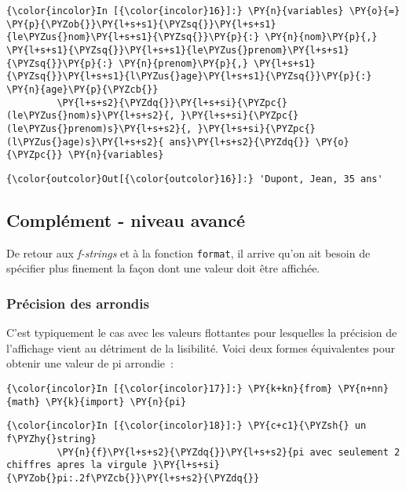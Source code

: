     \begin{Verbatim}[commandchars=\\\{\}]
{\color{incolor}In [{\color{incolor}16}]:} \PY{n}{variables} \PY{o}{=} \PY{p}{\PYZob{}}\PY{l+s+s1}{\PYZsq{}}\PY{l+s+s1}{le\PYZus{}nom}\PY{l+s+s1}{\PYZsq{}}\PY{p}{:} \PY{n}{nom}\PY{p}{,} \PY{l+s+s1}{\PYZsq{}}\PY{l+s+s1}{le\PYZus{}prenom}\PY{l+s+s1}{\PYZsq{}}\PY{p}{:} \PY{n}{prenom}\PY{p}{,} \PY{l+s+s1}{\PYZsq{}}\PY{l+s+s1}{l\PYZus{}age}\PY{l+s+s1}{\PYZsq{}}\PY{p}{:} \PY{n}{age}\PY{p}{\PYZcb{}}
         \PY{l+s+s2}{\PYZdq{}}\PY{l+s+si}{\PYZpc{}(le\PYZus{}nom)s}\PY{l+s+s2}{, }\PY{l+s+si}{\PYZpc{}(le\PYZus{}prenom)s}\PY{l+s+s2}{, }\PY{l+s+si}{\PYZpc{}(l\PYZus{}age)s}\PY{l+s+s2}{ ans}\PY{l+s+s2}{\PYZdq{}} \PY{o}{\PYZpc{}} \PY{n}{variables}
\end{Verbatim}


\begin{Verbatim}[commandchars=\\\{\}]
{\color{outcolor}Out[{\color{outcolor}16}]:} 'Dupont, Jean, 35 ans'
\end{Verbatim}
            
    \hypertarget{compluxe9ment---niveau-avancuxe9}{%
\subsection{Complément - niveau
avancé}\label{compluxe9ment---niveau-avancuxe9}}

    De retour aux \emph{f-strings} et à la fonction \texttt{format}, il
arrive qu'on ait besoin de spécifier plus finement la façon dont une
valeur doit être affichée.

    \hypertarget{pruxe9cision-des-arrondis}{%
\subsubsection{Précision des arrondis}\label{pruxe9cision-des-arrondis}}

    C'est typiquement le cas avec les valeurs flottantes pour lesquelles la
précision de l'affichage vient au détriment de la lisibilité. Voici deux
formes équivalentes pour obtenir une valeur de pi arrondie~:

    \begin{Verbatim}[commandchars=\\\{\}]
{\color{incolor}In [{\color{incolor}17}]:} \PY{k+kn}{from} \PY{n+nn}{math} \PY{k}{import} \PY{n}{pi}
\end{Verbatim}


    \begin{Verbatim}[commandchars=\\\{\}]
{\color{incolor}In [{\color{incolor}18}]:} \PY{c+c1}{\PYZsh{} un f\PYZhy{}string}
         \PY{n}{f}\PY{l+s+s2}{\PYZdq{}}\PY{l+s+s2}{pi avec seulement 2 chiffres apres la virgule }\PY{l+s+si}{\PYZob{}pi:.2f\PYZcb{}}\PY{l+s+s2}{\PYZdq{}}
\end{Verbatim}


